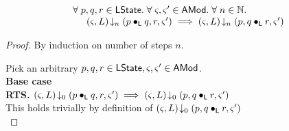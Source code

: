 %
%

%
%
\begin{lemma}\label{lemma:contextSwitch}
%
\[
\begin{array}{l}
	\forall\; p, q, r \in \textsf{LState}.\; \forall\; \varsigma_{}, \varsigma_{}' \in \textsf{AMod}.\; \forall\; n \in \mathbb{N}.\;\\
	\hspace*{0.5cm} \left(\varsigma_{}, L\right) \!\downarrow_{n} \left(p \bullet_{\textsf{L}} q, r, \varsigma_{}'\right) \implies 
									\left(\varsigma_{}, L\right) \!\downarrow_{n} \left(p, q \bullet_{\textsf{L}} r, \varsigma_{}'\right)
\end{array}
\]
%
\begin{proof} By induction on number of steps $n$.

\noindent Pick an arbitrary $p, q, r \in \textsf{LState}, \varsigma_{}, \varsigma_{}' \in \textsf{AMod}$.\\

\noindent\textbf{Base case}\\
\textbf{RTS. }\hspace*{0.5cm}$\left(\varsigma_{}, L\right) \!\downarrow_{0} \left(p \bullet_{\textsf{L}} q, r, \varsigma_{}'\right) \implies \left(\varsigma_{}, L\right) \!\downarrow_{0} \left(p, q \bullet_{\textsf{L}} r, \varsigma_{}'\right)$\\
This holds trivially by definition of $\left(\varsigma_{}, L\right) \!\downarrow_{0} \left(p, q \bullet_{\textsf{L}} r, \varsigma_{}'\right)$\\


\end{proof}
\end{lemma}
